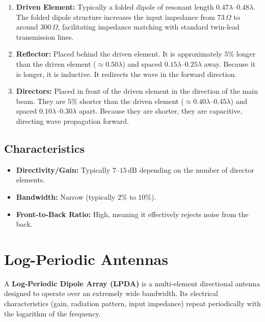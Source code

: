 \documentclass[12pt,a4paper]{article}
\begin{document}
\begin{enumerate}[label=\textbf{\arabic*.}, leftmargin=*, itemsep=4pt]
  \item \textbf{Driven Element:} Typically a folded dipole of resonant length $0.47\lambda$–$0.48\lambda$. The folded dipole structure increases the input impedance from $73\,\Omega$ to around $300\,\Omega$, facilitating impedance matching with standard twin-lead transmission lines.
  \item \textbf{Reflector:} Placed behind the driven element. It is approximately $5\%$ longer than the driven element ($\approx 0.50\lambda$) and spaced $0.15\lambda$–$0.25\lambda$ away. Because it is longer, it is inductive. It redirects the wave in the forward direction.
  \item \textbf{Directors:} Placed in front of the driven element in the direction of the main beam. They are $5\%$ shorter than the driven element ($\approx 0.40\lambda$–$0.45\lambda$) and spaced $0.10\lambda$–$0.30\lambda$ apart. Because they are shorter, they are capacitive, directing wave propagation forward.
\end{enumerate}

\subsection{Characteristics}
\begin{itemize}[leftmargin=*, itemsep=2pt]
  \item \textbf{Directivity/Gain:} Typically $7$–$15\,\text{dB}$ depending on the number of director elements.
  \item \textbf{Bandwidth:} Narrow (typically $2\%$ to $10\%$).
  \item \textbf{Front-to-Back Ratio:} High, meaning it effectively rejects noise from the back.
\end{itemize}

\section{Log-Periodic Antennas}

\begin{tcolorbox}[defbox, title={\textbf{Definition of Log-Periodic Antenna}}]
A \textbf{Log-Periodic Dipole Array (LPDA)} is a multi-element directional antenna designed to operate over an extremely wide bandwidth. Its electrical characteristics (gain, radiation pattern, input impedance) repeat periodically with the logarithm of the frequency.
\end{tcolorbox}
\end{document}
